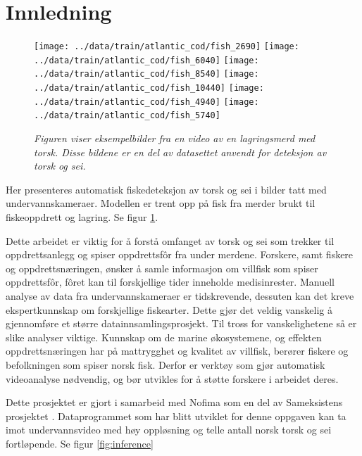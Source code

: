 \section{Innledning}




\begin{figure}[h!]
\begin{center} 
\texttt{[image: ../data/train/atlantic\_cod/fish\_2690]}
\texttt{[image: ../data/train/atlantic\_cod/fish\_6040]}
\texttt{[image: ../data/train/atlantic\_cod/fish\_8540]}
\texttt{[image: ../data/train/atlantic\_cod/fish\_10440]}
\texttt{[image: ../data/train/atlantic\_cod/fish\_4940]}
\texttt{[image: ../data/train/atlantic\_cod/fish\_5740]}
\caption{\small \sl Figuren viser eksempelbilder fra en video av en lagringsmerd med torsk. Disse bildene er en del av datasettet anvendt for deteksjon av torsk og sei. \label{fig:data}} 
\end{center} 
\end{figure} 

Her presenteres automatisk fiskedeteksjon av torsk og sei i bilder tatt med undervannskameraer. Modellen er trent opp på fisk fra merder brukt til fiskeoppdrett og lagring. Se figur \ref{fig:data}.

Dette arbeidet er viktig for å forstå omfanget av torsk og sei som trekker til oppdrettsanlegg og spiser oppdrettsfôr fra under merdene. Forskere, samt fiskere og oppdrettsnæringen, ønsker å samle informasjon om villfisk som spiser oppdrettsfôr, fôret kan til forskjellige tider inneholde medisinrester. Manuell analyse av data fra undervannskameraer er tidskrevende, dessuten kan det kreve ekspertkunnskap om forskjellige fiskearter. Dette gjør det veldig vanskelig å gjennomføre et større datainnsamlingsprosjekt. Til tross for vanskelighetene så er slike analyser viktige. Kunnskap om de marine økosystemene, og effekten oppdrettsnæringen har på mattrygghet og kvalitet av villfisk, berører fiskere og befolkningen som spiser norsk fisk. Derfor er verktøy som gjør automatisk videoanalyse nødvendig, og bør utvikles for å støtte forskere i arbeidet deres.

Dette prosjektet er gjort i samarbeid med Nofima som en del av Sameksistens prosjektet \cite{Robertsen 2020}. Dataprogrammet som har blitt utviklet for denne oppgaven kan ta imot undervannsvideo med høy oppløsning og telle antall norsk torsk og sei fortløpende. Se figur \ref{fig:inference}

